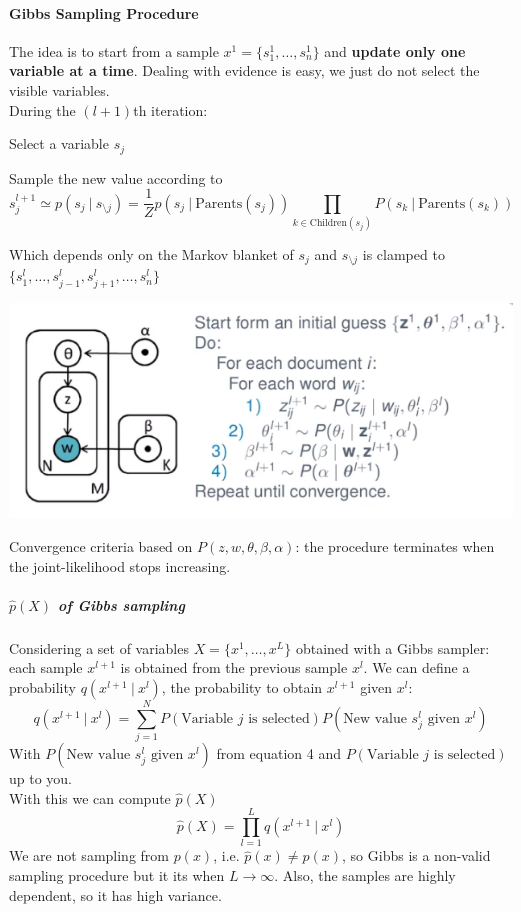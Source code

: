 \documentclass[10pt]{report}
\begin{document}
\paragraph{Gibbs Sampling Procedure}
The idea is to start from a sample $x^1=\{s_1^1,\ldots,s_n^1\}$ and \textbf{update only one variable at a time}. Dealing with evidence is easy, we just do not select the visible variables.\\
During the $(l+1)$th iteration:
\begin{list}{}{}
	\item Select a variable $s_j$
	\item Sample the new value according to $$s_j^{l+1}\simeq p(s_j\:|\:s_{\setminus j}) = \frac{1}{Z}p(s_j\:|\:\text{Parents}(s_j))\prod_{k\in\text{Children}(s_j)} P(s_k\:|\:\text{Parents}(s_k)) $$
\end{list}
Which depends only on the Markov blanket of $s_j$ and $s_{\setminus j}$ is clamped to$ \{s_1^l,\ldots,s_{j-1}^l,s_{j+1}^l,\ldots,s_n^l\}$
\begin{center}
	\includegraphics[scale=0.5]{45.png}
\end{center}
Convergence criteria based on $P(z,w,\theta,\beta,\alpha)$: the procedure terminates when the joint-likelihood stops increasing.
\subparagraph{$\hat{p}(X)$ of Gibbs sampling} Considering a set of variables $X=\{x^1,\ldots,x^L\}$ obtained with a Gibbs sampler: each sample $x^{l+1}$ is obtained from the previous sample $x^l$. We can define a probability $q(x^{l+1}\:|\:x^l)$, the probability to obtain $x^{l+1}$ given $x^l$:
$$q(x^{l+1}\:|\:x^l) = \sum_{j=1}^NP(\text{Variable }j\text{ is selected})P(\text{New value }s_j^l\text{ given }x^l)$$
With $P(\text{New value }s_j^l\text{ given }x^l)$ from equation 4 and $P(\text{Variable }j\text{ is selected})$ up to you.\\
With this we can compute $\hat{p}(X)$ $$\hat{p}(X)=\prod_{l=1}^L q(x^{l+1}\:|\:x^l)$$
We are not sampling from $p(x)$, i.e. $\hat{p}(x)\neq p(x)$, so Gibbs is a non-valid sampling procedure but it its when $L\rightarrow\infty$. Also, the samples are highly dependent, so it has high variance.
\end{document}
